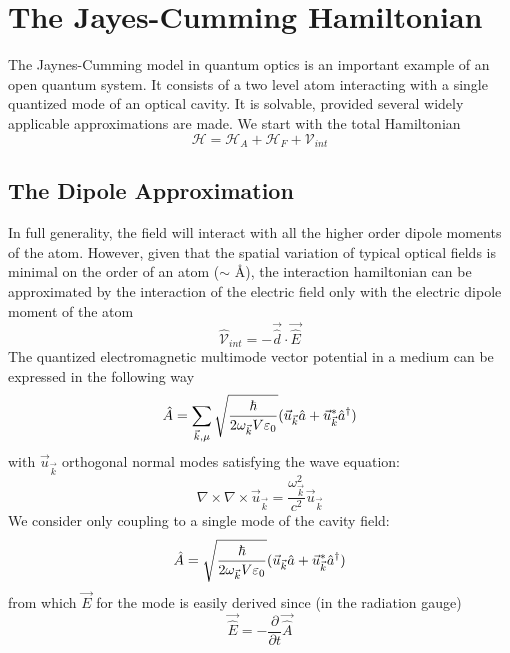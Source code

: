 
\section{The Jayes-Cumming Hamiltonian}
The Jaynes-Cumming model in quantum optics is an important example of an open quantum system. It consists of a two level atom interacting with a single quantized mode of an optical cavity. It is solvable, provided several widely applicable approximations are made. 
We start with the total Hamiltonian
\begin{equation}
	\mathscr{H} = \mathscr{H}_A + \mathscr{H}_F +\mathscr{V}_{int}
\end{equation}
\subsection{The Dipole Approximation}
In full generality, the field will interact with all the higher order dipole moments of the atom. However, given that the spatial variation of typical optical fields is minimal on the order of an atom ($\sim$ \AA), the interaction hamiltonian can be approximated by the interaction of the electric field only with the electric dipole moment of the atom 
\begin{equation}
	\hat{\mathscr{V}}_{int} = -\vec{\hat{d}} \cdot \vec{\hat{E}}
\end{equation}
The quantized electromagnetic multimode vector potential in a medium can be expressed in the following way \autocite[271-273]{Novotny2006}
\begin{equation}
	\hat{A} = \sum_{\vec{k}, \mu} \sqrt{\frac{\hbar}{2\omega_{\vec{k}} V \varepsilon_0}} (\vec{u}_{\vec{k}} \hat{a} + \vec{u}^*_{\vec{k}} \hat{a}^\dagger )
\end{equation}
with $\vec{u}_{\vec{k}}$ orthogonal normal modes satisfying the wave equation:
\begin{equation}
	\nabla \times \nabla \times \vec{u}_{\vec{k}} = \frac{\omega_{\vec{k}}^2}{c^2}  \vec{u}_{\vec{k}}
\end{equation}
We consider only coupling to a single mode of the cavity field:
\begin{equation}
	\hat{A} =  \sqrt{\frac{\hbar}{2\omega_{\vec{k}} V \varepsilon_0}} (\vec{u}_{\vec{k}} \hat{a} + \vec{u}^*_{\vec{k}} \hat{a}^\dagger )
\end{equation}
from which $\vec{E}$ for the mode is easily derived since (in the radiation gauge)
\begin{equation}
	\vec{\hat{E}} = -\frac{\partial}{\partial t}\vec{\hat{A}}
\end{equation}
